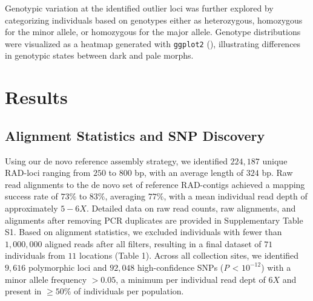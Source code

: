 \documentclass[9pt,a4paper,twoside]{rho-class/rho}
\begin{document}
        Genotypic variation at the identified outlier loci was further explored by categorizing individuals based on genotypes either as heterozygous, homozygous for the minor allele, or homozygous for the major allele. Genotype distributions were visualized as a heatmap generated with \texttt{ggplot2} (\cite{ggplot2}), illustrating differences in genotypic states between dark and pale morphs.

\section{Results}

    \subsection{Alignment Statistics and SNP Discovery}

        Using our de novo reference assembly strategy, we identified $224,187$ unique RAD-loci ranging from $250$ to $800$ bp, with an average length of $324$ bp. Raw read alignments to the de novo set of reference RAD-contigs achieved a mapping success rate of $73\%$ to $83\%$, averaging $77\%$, with a mean individual read depth of approximately $5-6X$. Detailed data on raw read counts, raw alignments, and alignments after removing PCR duplicates are provided in Supplementary Table S1. Based on alignment statistics, we excluded individuals with fewer than $1,000,000$ aligned reads after all filters, resulting in a final dataset of $71$ individuals from $11$ locations (Table 1). Across all collection sites, we identified $9,616$ polymorphic loci and $92,048$ high-confidence SNPs (\textit{P} < $10^{-12}$) with a minor allele frequency $>0.05$, a minimum per individual read dept of $6X$ and present in $\geq50\%$ of individuals per population.
        
\end{document}
